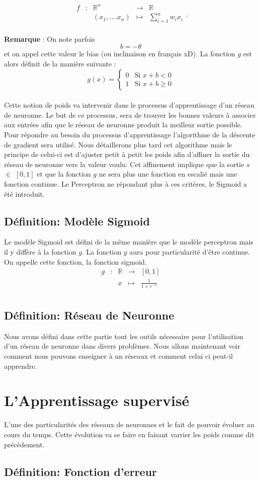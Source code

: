 \documentclass{article}
\newcommand{\fonction}[5]{
	\begin{array}{ccccc}
#1 & : & #2 & \to & #3\\
	& & #4 & \mapsto & #5\\ 
	\end{array}
}
\begin{document}
		\[\fonction{f}{\mathbb{R}^n}{\mathbb{R}}{(x_1,....x_n)}{\sum_{i=1}^{n} {w_ix_i}}. \]

	
	\textbf{Remarque} : On note parfois \[b = -\theta \]  et on appel cette valeur le bias (ou inclinaison en français xD). La fonction $g$ est alors définit de la manière suivante :   
		\[g(x) = \begin{cases} 0 &\mbox{Si } x + b < 0 \\
				 1 & \mbox{Si } x + b \geq 0
	 		 \end{cases} \] \\ 

	 
Cette notion de poids va intervenir dans le processus d'apprentissage d'un réseau de neuronne. Le but de ce processus, sera de trouver les bonnes valeurs à associer aux entrées afin que le réseau de neuronne produit la meilleur sortie possible. Pour répondre au besoin du processus d'apprentissage l'algorithme de la déscente de gradient sera utilisé. Nous détaillerons plus tard cet algorithme mais le principe de celui-ci est d'ajuster petit à petit les poids afin d'affiner la sortie du réseau de neuronne vers la valeur voulu. Cet affinement implique que la sortie $s$ $\in$ $\left[0,1\right]$ et que la fonction $g$ ne sera  plus une fonction en escalié mais une fonction continue. Le Perceptron ne répondant plus à ces critères, le Sigmoid a été introduit. \\

	\subsection{Définition: Modèle Sigmoid}
	 Le modèle Sigmoid est défini de la même manière que le modèle perceptron mais il y diffère à la fonction $g$. La fonction $g$ aura pour particularité d'être continue. On appelle cette fonction, la fonction sigmoid.  
		  \[ \fonction{g}{\mathbb{R}}{\left[0,1\right]}{x}{ \frac{1}{1+ e^{-x}}} \]
		
	\subsection{Définition: Réseau de Neuronne}
	
	Nous avons défini dans cette partie tout les outils nécessaire pour l'utilisation d'un réseau de neuronne dans divers problèmes. Nous allons maintenant voir comment nous pouvons enseigner à un réseaux et comment celui ci peut-il apprendre. 	
	
\section{L'Apprentissage supervisé}
	
	L'une des particularités des réseaux de neuronnes et le fait de pouvoir évoluer au cours du temps. Cette évolution va se faire en faisant varrier les poids comme dit précèdement. 
 
	\subsection{Définition: Fonction d'erreur}


 
\end{document}
